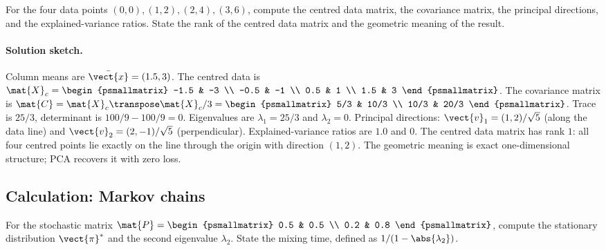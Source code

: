 \begin{exercise}
For the four data points $(0, 0), (1, 2), (2, 4), (3, 6)$, compute
the centred data matrix, the covariance matrix, the principal
directions, and the explained-variance ratios. State the rank of
the centred data matrix and the geometric meaning of the result.
\end{exercise}

\paragraph{Solution sketch.}
Column means are $\bar{\vect{x}} = (1.5, 3)$. The centred data is
$\mat{X}_{c} = \begin{psmallmatrix} -1.5 & -3 \\ -0.5 & -1 \\ 0.5 &
1 \\ 1.5 & 3 \end{psmallmatrix}$. The covariance matrix is
$\mat{C} = \mat{X}_{c}\transpose \mat{X}_{c}/3 = \begin{psmallmatrix}
5/3 & 10/3 \\ 10/3 & 20/3 \end{psmallmatrix}$. Trace is $25/3$,
determinant is $100/9 - 100/9 = 0$. Eigenvalues are $\lambda_{1} =
25/3$ and $\lambda_{2} = 0$. Principal directions: $\vect{v}_{1} =
(1, 2)/\sqrt{5}$ (along the data line) and $\vect{v}_{2} = (2, -1)/
\sqrt{5}$ (perpendicular). Explained-variance ratios are $1.0$ and
$0$. The centred data matrix has rank $1$: all four centred points
lie exactly on the line through the origin with direction $(1, 2)$.
The geometric meaning is exact one-dimensional structure; PCA
recovers it with zero loss.

\subsection*{Calculation: Markov chains}

\begin{exercise}
For the stochastic matrix $\mat{P} = \begin{psmallmatrix} 0.5 & 0.5
\\ 0.2 & 0.8 \end{psmallmatrix}$, compute the stationary distribution
$\vect{\pi}^{*}$ and the second eigenvalue $\lambda_{2}$. State the
mixing time, defined as $1/(1 - \abs{\lambda_{2}})$.
\end{exercise}

